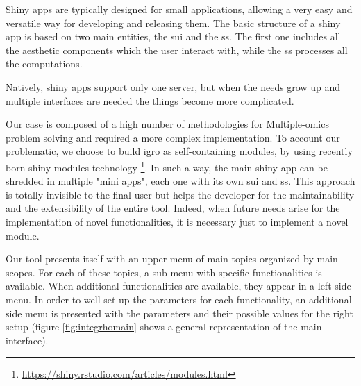 Shiny apps are typically designed for small applications, allowing a very easy and versatile way for developing and releasing them.
The basic structure of a shiny app is based on two main entities, the \gls{sui} and the \gls{ss}.
The first one includes all the aesthetic components which the user interact with, while the \gls{ss} processes all the computations.

Natively, shiny apps support only one server, but when the needs grow up and multiple interfaces are needed the things become more complicated. 

Our case is composed of a high number of methodologies for Multiple-omics problem solving and required a more complex implementation.
To account our problematic, we choose to build \gls{igro} as self-containing modules, by using recently born shiny modules technology \footnote{\url{https://shiny.rstudio.com/articles/modules.html}}.
In such a way, the main shiny app can be shredded in multiple "mini apps", each one with its own \gls{sui} and \gls{ss}.
This approach is totally invisible to the final user but helps the developer for the maintainability and the extensibility of the entire tool.
Indeed, when future needs arise for the implementation of novel functionalities, it is necessary just to implement a novel module.

Our tool presents itself with an upper menu of main topics organized by main scopes. 
For each of these topics, a sub-menu with specific functionalities is available.
When additional functionalities are available, they appear in a left side menu.
In order to well set up the parameters for each functionality, an additional side menu is presented with the parameters and their possible values for the right setup (figure \ref{fig:integrhomain} shows a general representation of the main interface).

